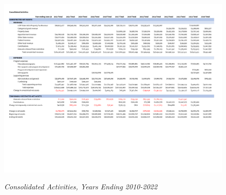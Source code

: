 \begin{figure}
  \caption[Consolidated Activities, Years Ending 2010–2022]{\textit{Consolidated Activities, Years Ending 2010-2022}}\label{fig:consolidated_activities_2010-2022} %
  \includegraphics[width=\textheight]{Consolidated_Financial_Statements/Consolidated_Activities_Years_2010-2022-2up.pdf}\\ %
  \end{figure}


